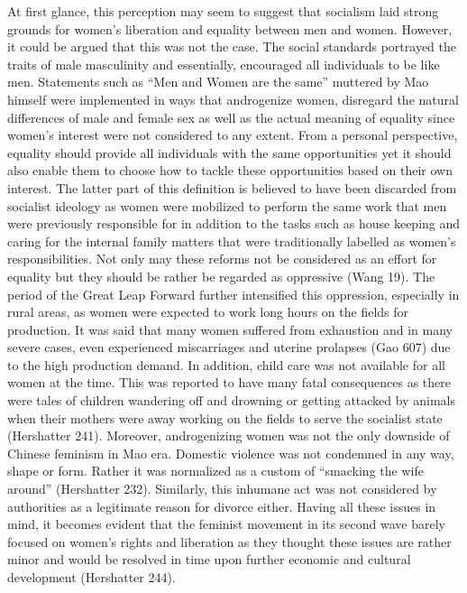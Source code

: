 \documentclass[12pt]{article}
\begin{document}
\begin{flushleft}
		At first glance, this perception may seem to suggest that socialism laid strong grounds for women’s liberation and equality between men and women. However, it could be argued that this was not the case. The social standards portrayed the traits of male masculinity and essentially, encouraged all individuals to be like men. Statements such as “Men and Women are the same” muttered by Mao himself were implemented in ways that androgenize women, disregard the natural differences of male and female sex as well as the actual meaning of equality since women’s interest were not considered to any extent. From a personal perspective, equality should provide all individuals with the same opportunities yet it should also enable them to choose how to tackle these opportunities based on their own interest. The latter part of this definition is believed to have been discarded from socialist ideology as women were mobilized to perform the same work that men were previously responsible for in addition to the tasks such as house keeping and caring for the internal family matters that were traditionally labelled as women’s responsibilities. Not only may these reforms not be considered as an effort for equality but they should be rather be regarded as oppressive (Wang 19). 
		The period of the Great Leap Forward further intensified this oppression, especially in rural areas, as women were expected to work long hours on the fields for production. It was said that many women suffered from exhaustion and in many severe cases, even experienced miscarriages and uterine prolapses (Gao 607) due to the high production demand. In addition, child care was not available for all women at the time. This was reported to have many fatal consequences as there were tales of children wandering off and drowning or getting attacked by animals when their mothers were away working on the fields to serve the socialist state (Hershatter 241). Moreover,  androgenizing women was not the only downside of Chinese feminism in Mao era. Domestic violence was not condemned in any way, shape or form. Rather it was normalized as a custom of “smacking the wife around” (Hershatter 232). Similarly, this inhumane act was not considered by authorities as a legitimate reason for divorce either. Having all these issues in mind, it becomes evident that the feminist movement in its second wave barely focused on women’s rights and liberation as they thought these issues are rather minor and would be resolved in time upon further economic and cultural development (Hershatter 244).
		

\end{flushleft}
\end{document}
